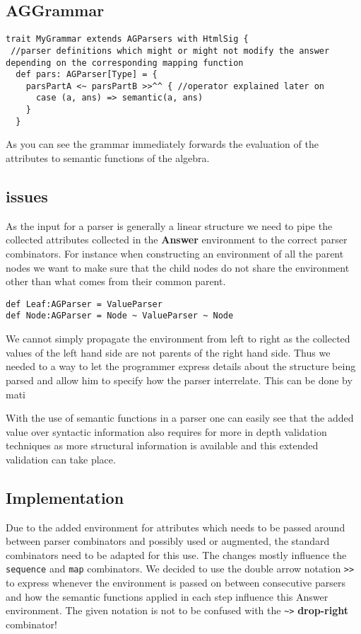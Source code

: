 \subsection{AGGrammar}
\begin{lstlisting}
trait MyGrammar extends AGParsers with HtmlSig {
 //parser definitions which might or might not modify the answer depending on the corresponding mapping function
  def pars: AGParser[Type] = {
    parsPartA <~ parsPartB >>^^ { //operator explained later on
      case (a, ans) => semantic(a, ans)
    }
  }
\end{lstlisting}

As you can see the grammar immediately forwards the evaluation of the attributes to semantic functions of the algebra. 

\subsection{issues}
As the input for a parser is generally a linear structure we need to pipe the collected attributes collected in the \textbf{Answer} environment to the correct parser combinators. For instance when constructing an environment of all the parent nodes we want to make sure that the child nodes do not share the environment other than what comes from their common parent.

\begin{lstlisting}
def Leaf:AGParser = ValueParser
def Node:AGParser = Node ~ ValueParser ~ Node
\end{lstlisting}

We cannot simply propagate the environment from left to right as the collected values of the left hand side are not parents of the right hand side. Thus we needed to a way to let the programmer express details about the structure being parsed and allow him to specify how the parser interrelate. This can be done by mati

With the use of semantic functions in a parser one can easily see that the added value over syntactic information also requires for more in depth validation techniques as more structural information is available and this extended validation can take place.

\subsection{Implementation}
Due to the added environment for attributes which needs to be passed around between parser combinators and possibly used or augmented, the standard combinators need to be adapted for this use. The changes mostly influence the \verb/sequence/ and \verb/map/ combinators.
We decided to use the double arrow notation \verb/>>/ to express whenever the environment is passed on between consecutive parsers and how the semantic functions applied in each step influence this Answer environment. The given notation is not to be confused with the \verb/~>/ \textbf{drop-right} combinator!

